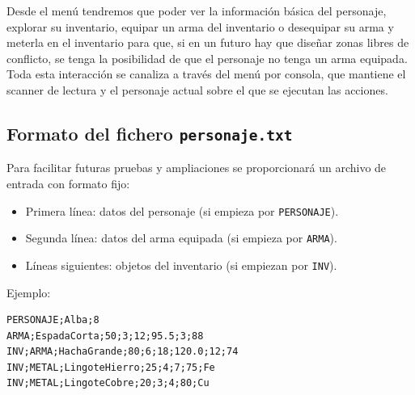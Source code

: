 \documentclass[11pt,a4paper]{article}
\begin{document}
Desde el menú tendremos que poder ver la información básica del personaje, explorar su inventario, equipar un arma del inventario o desequipar su arma y meterla en el inventario para que, si en un futuro hay que diseñar zonas libres de conflicto, se tenga la posibilidad de que el personaje no tenga un arma equipada. Toda esta interacción se canaliza a través del menú por consola, que mantiene el scanner de lectura y el personaje actual sobre el que se ejecutan las acciones.
\subsection{Formato del fichero \texttt{personaje.txt}}

Para facilitar futuras pruebas y ampliaciones se proporcionará un archivo de entrada con formato fijo:

\begin{itemize}
    \item Primera línea: datos del personaje (si empieza por \texttt{PERSONAJE}).
    \item Segunda línea: datos del arma equipada (si empieza por \texttt{ARMA}).
    \item Líneas siguientes: objetos del inventario (si empiezan por \texttt{INV}).
\end{itemize}

Ejemplo:

\begin{verbatim}
PERSONAJE;Alba;8
ARMA;EspadaCorta;50;3;12;95.5;3;88
INV;ARMA;HachaGrande;80;6;18;120.0;12;74
INV;METAL;LingoteHierro;25;4;7;75;Fe
INV;METAL;LingoteCobre;20;3;4;80;Cu
\end{verbatim}
\end{document}

